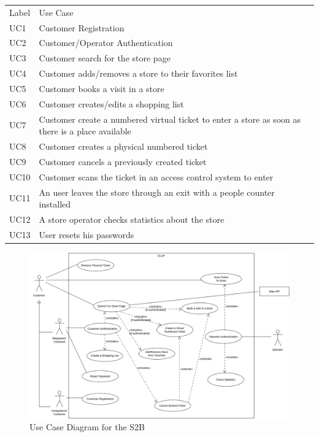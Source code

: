 \renewcommand{\arraystretch}{1.4}
\begin{tabular}{C{2cm}L{10.5cm}C{2.6cm}}
    Label & Use Case                                                                                         \\
    UC1   & Customer Registration                                                                            \\
    UC2   & Customer/Operator Authentication                                                                          \\
    UC3   & Customer search for the store page                                                               \\
    UC4   & Customer adds/removes a store to their favorites list                                            \\
    UC5   & Customer books a visit in a store                                                                \\
    UC6   & Customer creates/edits a shopping list                                                           \\
    UC7   & Customer create a numbered virtual ticket to enter a store as soon as there is a place available \\
    UC8   & Customer creates a physical numbered ticket                                                      \\
    UC9   & Customer cancels a previously created ticket                                                     \\
    UC10  & Customer scans the ticket in an access control system to enter                                   \\
    UC11  & An user leaves the store through an exit with a people counter installed                         \\
    UC12  & A store operator checks statistics about the store  \\
    UC13  & User resets his passwords \\
\end{tabular}
\medskip
\begin{figure}[H]
    \includegraphics[width=\textwidth]{Images/UML_use_case_diagram.png}
    \caption{\label{fig:Use_Case_Diag}Use Case Diagram for the S2B}
\end{figure}


